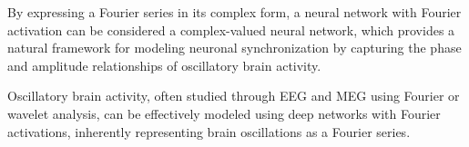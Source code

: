 \documentclass{article} %
\theoremstyle{plain}
\theoremstyle{definition}
\theoremstyle{remark}
\begin{document}

By expressing a Fourier series in its complex form, a neural network with Fourier activation can be considered a complex-valued neural network, which provides a natural framework for modeling neuronal synchronization by capturing the phase and amplitude relationships of oscillatory brain activity.

Oscillatory brain activity, often studied through EEG and MEG using Fourier or wavelet analysis, can be effectively modeled using deep networks with Fourier activations, inherently representing brain oscillations as a Fourier series.



\end{document}
